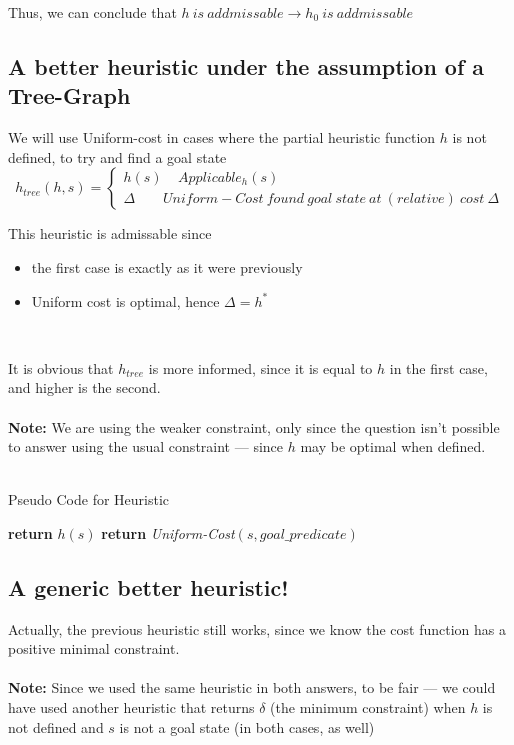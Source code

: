 \documentclass{article}
\begin{document}
Thus, we can conclude that $ h\ is\ addmissable \rightarrow h_0\ is\ addmissable $

\subsection*{A better heuristic under the assumption of a Tree-Graph}
We will use Uniform-cost in cases where the partial heuristic function $h$ is not defined, to try and find a goal state
\[
  h_{tree}(h,s)=\begin{cases}
               h(s) \ \ \ \ \  Applicable_h(s) \\
               \Delta \ \ \ \ \ \ \ \  \  Uniform-Cost\ found\ goal\ state\ at\ (relative)\ cost\ \Delta
            \end{cases}
\]

This heuristic is admissable since
\begin{itemize}
\item the first case is exactly as it were previously
\item Uniform cost is optimal, hence $\Delta = h^* $
\end{itemize}
\ 

It is obvious that $h_{tree}$ is more informed, since it is equal to $h$ in the first case, and higher is the second.
\\~\\
\textbf{Note: } We are using the weaker constraint, only since the question isn't possible to answer using the usual constraint --- since $h$ may be optimal when defined.
\\~\\

\begin{algorithm}
\caption{Pseudo Code for Heuristic}
\begin{algorithmic}[1]
 
	\State \textbf{return} $h(s)$
\EndIf
\State
\State \textbf{return} \emph{Uniform-Cost}$(s, goal\_predicate)$
\EndProcedure
\end{algorithmic}
\end{algorithm}

\subsection*{A generic better heuristic!}
Actually, the previous heuristic still works, since we know the cost function has a positive minimal constraint.
\\~\\
\textbf{Note: } Since we used the same heuristic in both answers, to be fair --- we could have used another heuristic that returns $\delta$ (the minimum constraint) when $h$ is not defined and $s$ is not a goal state (in both cases, as well)
\end{document}
